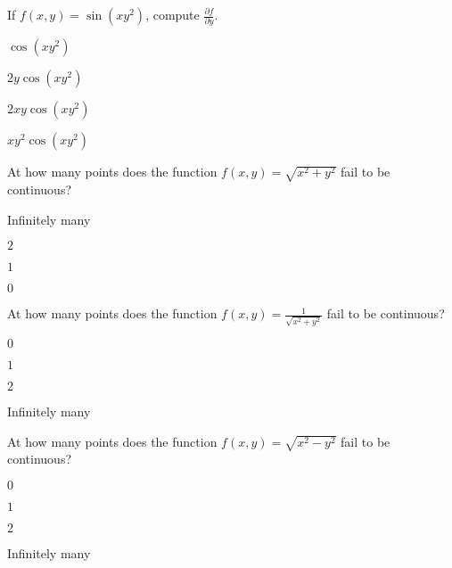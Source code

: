 \begin{readinessAssuranceTest}
\item If \(f(x,y) = \sin(xy^2)\), compute \(\frac{\partial f}{\partial y}\).
\begin{multicols}{4}
\begin{readinessAssuranceTestChoices}
\item \(\cos(xy^2)\) 
\item \(2y\cos(xy^2)\) 
\item \(2xy\cos(xy^2)\)  %
\item \(xy^2\cos(xy^2)\) 
\end{readinessAssuranceTestChoices}
\end{multicols}

\item At how many points does the function \(f(x,y)=\sqrt{x^2+y^2}\) fail to be continuous?
\begin{multicols}{4}
\begin{readinessAssuranceTestChoices}
\item Infinitely many
\item \(2\) 
\item \(1\)  
\item \(0\) %
\end{readinessAssuranceTestChoices}
\end{multicols}


\item At how many points does the function \(f(x,y)=\frac{1}{\sqrt{x^2+y^2}}\) fail to be continuous?
\begin{multicols}{4}
\begin{readinessAssuranceTestChoices}
\item \(0\) 
\item \(1\) %
\item \(2\) 
\item Infinitely many
\end{readinessAssuranceTestChoices}
\end{multicols}

\item At how many points does the function \(f(x,y)=\sqrt{x^2-y^2}\) fail to be continuous?
\begin{multicols}{4}
\begin{readinessAssuranceTestChoices}
\item \(0\) 
\item \(1\) 
\item \(2\) 
\item Infinitely many %
\end{readinessAssuranceTestChoices}
\end{multicols}


\end{readinessAssuranceTest}
